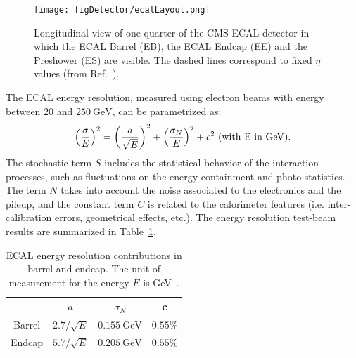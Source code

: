 \begin{figure}[hbt]
  \begin{center}
    \texttt{[image: figDetector/ecalLayout.png]}
    \caption{Longitudinal view of one quarter of the CMS ECAL detector in which the ECAL Barrel (EB), the ECAL Endcap (EE) and the Preshower
             (ES) are visible.  
             The dashed lines correspond to fixed $\eta$ values (from Ref.~\cite{Chatrchyan:2008aa}).} 
    \label{fig:ecalLayout}
  \end{center}
\end{figure}

The ECAL energy resolution, measured using electron beams with energy
between $20$ and $250~\si{\GeV}$, can be parametrized as: 
\begin{equation}
    \left(\frac{\sigma}{E}\right)^2= \left(\frac{a}{\sqrt{E}}\right)^2 + \left(\frac{\sigma_N}{E}\right)^2 + c^2\mbox{      (with E in \si{\GeV}).}
    \label{eq:resolutionECAL}
\end{equation} 
The stochastic term $S$ includes the statistical behavior of the interaction
processes, such as fluctuations on the energy containment and photo-statistics. The term $N$ takes into account
the noise associated to the electronics and the pileup, and the constant term $C$
is related to the calorimeter features (i.e. inter-calibration errors, geometrical effects, etc.). 
The energy resolution test-beam results are summarized in Table~\ref{tab:ecalRes}.

\begin{table}[htp]
\begin{center}
\caption{ECAL energy resolution contributions in barrel and endcap. The unit of measurement for
the energy $E$ is \si{\GeV}~\cite{ecalTDR}.}
\label{tab:ecalRes}
\begin{tabular}{cc|c|c|}\\
\cline{2-4}
                               & \multicolumn{1}{|c|}{$a$}               & $\sigma_N$              & c \\\hline
\multicolumn{1}{|c|}{Barrel}   & $2.7/\sqrt{E}$    & $0.155~\si{\GeV}$       & $0.55\%$\\
\multicolumn{1}{|c|}{Endcap}   & $5.7/\sqrt{E}$    & $0.205~\si{\GeV}$       & $0.55\%$\\
\hline
\end{tabular}
\end{center}
\end{table}


